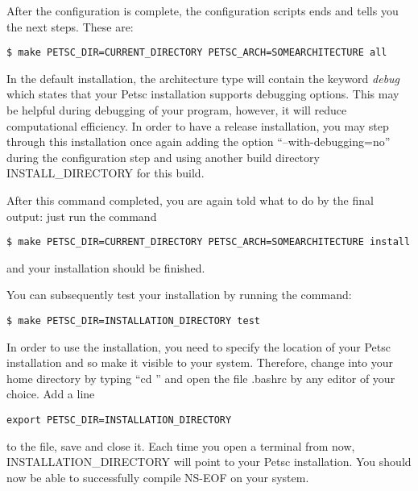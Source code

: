 \documentclass[a4paper]{article}
\begin{document}
After the configuration is complete, the configuration scripts ends and tells you the next steps. These are:

\begin{lstlisting}
$ make PETSC_DIR=CURRENT_DIRECTORY PETSC_ARCH=SOMEARCHITECTURE all
\end{lstlisting}
In the default installation, the architecture type will contain the keyword {\it debug} which states that your Petsc installation supports debugging options.
This may be helpful during debugging of your program, however, it will reduce computational efficiency.
In order to have a release installation, you may step through this installation once again adding the option ``--with-debugging=no'' during the configuration step and using another build directory INSTALL\_DIRECTORY for this build.

After this command completed, you are again told what to do by the final output: just run the command

\begin{lstlisting}
$ make PETSC_DIR=CURRENT_DIRECTORY PETSC_ARCH=SOMEARCHITECTURE install
\end{lstlisting}
and your installation should be finished.

You can subsequently test your installation by running the command:
\begin{lstlisting}
$ make PETSC_DIR=INSTALLATION_DIRECTORY test
\end{lstlisting}

In order to use the installation, you need to specify the location of your Petsc installation and so make it visible to your system.
Therefore, change into your home directory by typing ``cd '' and open the file .bashrc by any editor of your choice.
Add a line

\begin{lstlisting}
export PETSC_DIR=INSTALLATION_DIRECTORY
\end{lstlisting}
to the file, save and close it.
Each time you open a terminal from now, INSTALLATION\_DIRECTORY will point to your Petsc installation.
You should now be able to successfully compile NS-EOF on your system.
\end{document}
